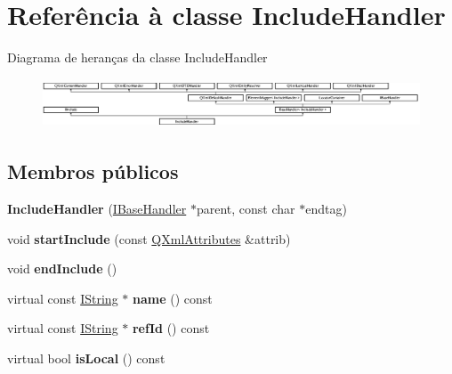 \hypertarget{class_include_handler}{\section{Referência à classe Include\-Handler}
\label{class_include_handler}
}
Diagrama de heranças da classe Include\-Handler\begin{figure}[H]
\begin{center}
\leavevmode
\includegraphics[height=1.467890cm]{class_include_handler}
\end{center}
\end{figure}
\subsection*{Membros públicos}
\begin{DoxyCompactItemize}
\item 
\hypertarget{class_include_handler_a7a92bf4a2f7faea5fabf917394a33c94}{{\bfseries Include\-Handler} (\hyperlink{class_i_base_handler}{I\-Base\-Handler} $\ast$parent, const char $\ast$endtag)}\label{class_include_handler_a7a92bf4a2f7faea5fabf917394a33c94}

\item 
\hypertarget{class_include_handler_abdbf8364f1bfddda9458731fc58e54ff}{void {\bfseries start\-Include} (const \hyperlink{class_q_xml_attributes}{Q\-Xml\-Attributes} \&attrib)}\label{class_include_handler_abdbf8364f1bfddda9458731fc58e54ff}

\item 
\hypertarget{class_include_handler_a2c254a690fa44fcb4871b1fb83d0958e}{void {\bfseries end\-Include} ()}\label{class_include_handler_a2c254a690fa44fcb4871b1fb83d0958e}

\item 
\hypertarget{class_include_handler_a61b3e127d271cd613cc928e35f60125e}{virtual const \hyperlink{class_i_string}{I\-String} $\ast$ {\bfseries name} () const }\label{class_include_handler_a61b3e127d271cd613cc928e35f60125e}

\item 
\hypertarget{class_include_handler_a2488ce15cc44de0c90c8f6116e9d5094}{virtual const \hyperlink{class_i_string}{I\-String} $\ast$ {\bfseries ref\-Id} () const }\label{class_include_handler_a2488ce15cc44de0c90c8f6116e9d5094}

\item 
\hypertarget{class_include_handler_ae0dcee8e04f5bb097c824116db30081c}{virtual bool {\bfseries is\-Local} () const }\label{class_include_handler_ae0dcee8e04f5bb097c824116db30081c}

\end{DoxyCompactItemize}
